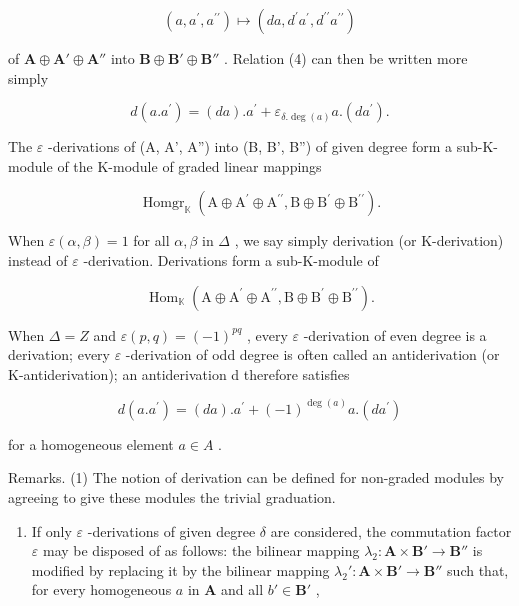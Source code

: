 \[
(a, a ^ {\prime}, a ^ {\prime \prime}) \mapsto (d a, d ^ {\prime} a ^ {\prime}, d ^ {\prime \prime} a ^ {\prime \prime})
\]

of \(\mathbf{A} \oplus \mathbf{A}' \oplus \mathbf{A}''\) into \(\mathbf{B} \oplus \mathbf{B}' \oplus \mathbf{B}''\) . Relation (4) can then be written more simply

\[
d (a. a ^ {\prime}) = (d a). a ^ {\prime} + \varepsilon_ {\delta . \deg (a)} a. (d a ^ {\prime}).\tag{5}
\]

The \(\varepsilon\) -derivations of (A, A', A'') into (B, B', B'') of given degree form a sub-K-module of the K-module of graded linear mappings

\[
\operatorname{Homgr} _ {\mathbb {K}} (\mathrm{A} \oplus \mathrm{A} ^ {\prime} \oplus \mathrm{A} ^ {\prime \prime}, \mathrm{B} \oplus \mathrm{B} ^ {\prime} \oplus \mathrm{B} ^ {\prime \prime}).
\]

When \(\varepsilon(\alpha, \beta) = 1\) for all \(\alpha, \beta\) in \(\Delta\) , we say simply derivation (or K-derivation) instead of \(\varepsilon\) -derivation. Derivations form a sub-K-module of

\[
\operatorname{Hom} _ {\mathbb {K}} (\mathrm{A} \oplus \mathrm{A} ^ {\prime} \oplus \mathrm{A} ^ {\prime \prime}, \mathrm{B} \oplus \mathrm{B} ^ {\prime} \oplus \mathrm{B} ^ {\prime \prime}).
\]

When \(\Delta = Z\) and \(\varepsilon(p, q) = (-1)^{pq}\) , every \(\varepsilon\) -derivation of even degree is a derivation; every \(\varepsilon\) -derivation of odd degree is often called an antiderivation (or K-antiderivation); an antiderivation d therefore satisfies

\[
d (a. a ^ {\prime}) = (d a). a ^ {\prime} + (- 1) ^ {\deg (a)} a. (d a ^ {\prime})\tag{6}
\]

for a homogeneous element \(a \in A\) .

Remarks. (1) The notion of derivation can be defined for non-graded modules by agreeing to give these modules the trivial graduation.

\begin{enumerate}
\def\labelenumi{(\arabic{enumi})}
\setcounter{enumi}{1}
\tightlist
\item
  If only \(\varepsilon\) -derivations of given degree \(\delta\) are considered, the commutation factor \(\varepsilon\) may be disposed of as follows: the bilinear mapping \(\lambda_2: \mathbf{A} \times \mathbf{B}' \to \mathbf{B}''\) is modified by replacing it by the bilinear mapping \(\lambda_2': \mathbf{A} \times \mathbf{B}' \to \mathbf{B}''\) such that, for every homogeneous \(a\) in \(\mathbf{A}\) and all \(b' \in \mathbf{B}'\) ,
\end{enumerate}

